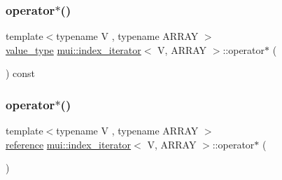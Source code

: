 \mbox{\label{structmui_1_1index__iterator_a8a9a41e163764c4e4a72a8e06f4835be}} 
\subsubsection{\texorpdfstring{operator$\ast$()}{operator*()}\hspace{0.1cm}{\footnotesize\ttfamily [1/2]}}
{\footnotesize\ttfamily template$<$typename V , typename A\+R\+R\+AY $>$ \\
\hyperlink{structmui_1_1index__iterator_a795af944e7eb34f4842a7f5d138fe186}{value\+\_\+type} \hyperlink{structmui_1_1index__iterator}{mui\+::index\+\_\+iterator}$<$ V, A\+R\+R\+AY $>$\+::operator$\ast$ (\begin{DoxyParamCaption}{ }\end{DoxyParamCaption}) const\hspace{0.3cm}{\ttfamily [inline]}}

\mbox{\label{structmui_1_1index__iterator_a967bee24f2b395b2a25dc76f9d22aacb}} 
\subsubsection{\texorpdfstring{operator$\ast$()}{operator*()}\hspace{0.1cm}{\footnotesize\ttfamily [2/2]}}
{\footnotesize\ttfamily template$<$typename V , typename A\+R\+R\+AY $>$ \\
\hyperlink{structmui_1_1index__iterator_a3854dd112d5ca1a649babb0357e02394}{reference} \hyperlink{structmui_1_1index__iterator}{mui\+::index\+\_\+iterator}$<$ V, A\+R\+R\+AY $>$\+::operator$\ast$ (\begin{DoxyParamCaption}{ }\end{DoxyParamCaption})\hspace{0.3cm}{\ttfamily [inline]}}

\mbox{\label{structmui_1_1index__iterator_aaf0cc8e107e38388a15cf807b8f682fa}} 
